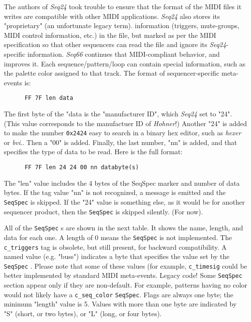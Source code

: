    The authors of \textsl{Seq24} took trouble to ensure that the format
   of the MIDI files it writes are compatible with other MIDI applications.
   \textsl{Seq24} also stores its "proprietary" (an unfortunate legacy term).
   information (triggers, mute-groups, MIDI control
   information, etc.) in the file, but marked as per the MIDI specification
   so that other sequencers can read
   the file and ignore its \textsl{Seq24}-specific information.
   \textsl{Seq66} continues that MIDI-compliant behavior, and improves it.
   Each sequence/pattern/loop can contain special information, such as the
   palette color assigned to that track.
   The format of sequencer-specific meta-events is:

   \begin{verbatim}
      FF 7F len data
   \end{verbatim}

   The first byte of the "data is the "manufacturer ID", which \textsl{Seq24}
   set to "24". (This value corresponds to the manufactuer ID of
   \textsl{Hohner}!)
   Another "24" is added to make the number \texttt{0x2424}
   easy to search in a binary hex editor, such as \textsl{hexer} or
   \textsl{bvi}..
   Then a "00" is added.  Finally, the last number, "nn" is added, and that
   specifies the type of data to be read.  Here is the full format:

   \begin{verbatim}
      FF 7F len 24 24 00 nn databyte(s)
   \end{verbatim}

   The "len" value includes the 4 bytes of the SeqSpec marker and number
   of data bytes.
   If the tag value "nn" is not recognized, a message is emitted and the
  \texttt{SeqSpec} is skipped.  If the "24" value is something else, as it
  would be for another sequencer product, then the
   \texttt{SeqSpec} is skipped silently. (For now).

   All of the
   \texttt{SeqSpec} s are shown in the next table. It shows the name, length,
   and data for each one. A length of 0 means the
   \texttt{SeqSpec} is not implemented.
   The \texttt{c\_triggers} tag is obsolete, but still present, for
   backward compatibility.
   A named value (e.g. "buss") indicates a byte that specifies the value set by
   the \texttt{SeqSpec} .
   Please note that some of these values (for example, \texttt{c\_timesig}
   could be better implemented by standard MIDI meta-events. Legacy code!
   Some \texttt{SeqSpec} section appear only if they are non-default.
   For example, patterns having no color would not likely have a
   \texttt{c\_seq\_color} \texttt{SeqSpec}.
   Flags are always one byte; the minimum "length" value is 5.
   Values with more than one byte are indicated by "S" (short, or two bytes),
   or "L" (long, or four bytes).

